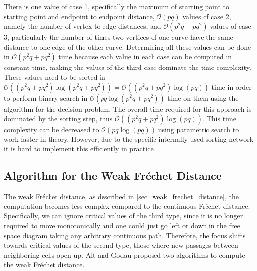 \documentclass[
oneside,
fontsize=11pt
]{scrartcl}
\begin{document}
There is one value of case 1, 
specifically the maximum of starting point to starting point and endpoint to endpoint distance,
$\mathcal{O}(pq)$ values of case 2, 
namely the number of vertex to edge distances,
and $\mathcal{O}(p^2q + pq^2)$ values of case 3,
particularly the number of times two vertices of one curve have the same distance to one edge of the other curve.
Determining all these values can be done in $\mathcal{O}(p^2q + pq^2)$ time 
because each value in each case can be computed in constant time, 
making the values of the third case dominate the time complexity.
These values need to be sorted in $\mathcal{O}((p^2q + pq^2) \log (p^2q + pq^2)) = \mathcal{O}((p^2q + pq^2) \log (pq))$ time
in order to perform binary search in $\mathcal{O}(pq \log (p^2q + pq^2))$ time on them
using the algorithm for the decision problem.
The overall time required for this approach is dominated by the sorting step, 
thus $\mathcal{O}((p^2q + pq^2) \log (pq))$.
This time complexity can be decreased to $\mathcal{O}(pq \log (pq))$ 
using parametric search \cite{megiddo_applying_1983, cole_slowing_1987} to work faster in theory.
However, due to the specific internally used sorting network 
it is hard to implement this efficiently in practice. \cite{alt_computing_1995}






\subsection{Algorithm for the Weak Fréchet Distance}
\label{sec_weak_algorithm}
The weak Fréchet distance, as described in \autoref{sec_weak_frechet_distance},
the computation becomes less complex compared to the continuous Fréchet distance.
Specifically, we can ignore critical values of the third type, 
since it is no longer required to move monotonically 
and one could just go left or down in the free space diagram taking any arbitrary continuous path.
Therefore, the focus shifts towards critical values of the second type, 
those where new passages between neighboring cells open up.
Alt and Godau \cite{alt_computing_1995} proposed two algorithms to compute the weak Fréchet distance.
\end{document}
